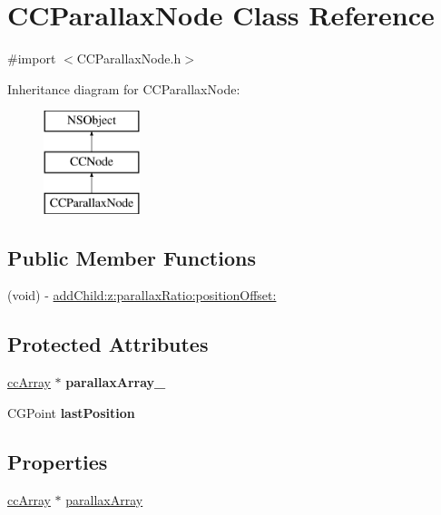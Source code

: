 \hypertarget{interface_c_c_parallax_node}{\section{C\-C\-Parallax\-Node Class Reference}
\label{interface_c_c_parallax_node}
}


{\ttfamily \#import $<$C\-C\-Parallax\-Node.\-h$>$}

Inheritance diagram for C\-C\-Parallax\-Node\-:\begin{figure}[H]
\begin{center}
\leavevmode
\includegraphics[height=3.000000cm]{interface_c_c_parallax_node}
\end{center}
\end{figure}
\subsection*{Public Member Functions}
\begin{DoxyCompactItemize}
\item 
(void) -\/ \hyperlink{interface_c_c_parallax_node_a47156fb7ca353893c6039ae8d26dbdf5}{add\-Child\-:z\-:parallax\-Ratio\-:position\-Offset\-:}
\end{DoxyCompactItemize}
\subsection*{Protected Attributes}
\begin{DoxyCompactItemize}
\item 
\hypertarget{interface_c_c_parallax_node_a8ce28831e8afaf61bafd07fae84d6871}{\hyperlink{structcc_array}{cc\-Array} $\ast$ {\bfseries parallax\-Array\-\_\-}}\label{interface_c_c_parallax_node_a8ce28831e8afaf61bafd07fae84d6871}

\item 
\hypertarget{interface_c_c_parallax_node_adab04d26086a11b40b9b384c018e7727}{C\-G\-Point {\bfseries last\-Position}}\label{interface_c_c_parallax_node_adab04d26086a11b40b9b384c018e7727}

\end{DoxyCompactItemize}
\subsection*{Properties}
\begin{DoxyCompactItemize}
\item 
\hyperlink{structcc_array}{cc\-Array} $\ast$ \hyperlink{interface_c_c_parallax_node_ac06bed34e14b62be16a10fd9939eedc8}{parallax\-Array}
\end{DoxyCompactItemize}


